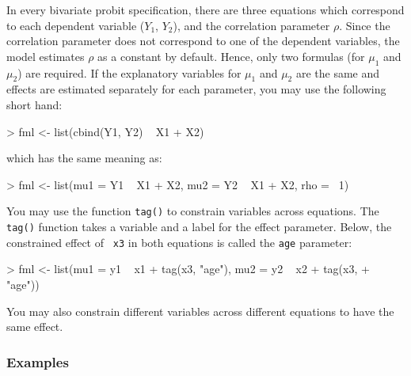 \documentclass{article}
\begin{document}
In every bivariate probit specification, there are three equations
which correspond to each dependent variable ($Y_1$, $Y_2$), and the
correlation parameter $\rho$.  Since the correlation parameter does
not correspond to one of the dependent variables, the model estimates
$\rho$ as a constant by default.  Hence, only two formulas (for
$\mu_1$ and $\mu_2$) are required.  If the explanatory variables for
$\mu_1$ and $\mu_2$ are the same and effects are estimated separately
for each parameter, you may use the following short hand:  
\begin{Schunk}
\begin{Sinput}
> fml <- list(cbind(Y1, Y2) ~ X1 + X2)
\end{Sinput}
\end{Schunk}
which has the same meaning as:  
\begin{Schunk}
\begin{Sinput}
> fml <- list(mu1 = Y1 ~ X1 + X2, mu2 = Y2 ~ X1 + X2, rho = ~1)
\end{Sinput}
\end{Schunk}
You may use the function {\tt tag()} to constrain variables across
equations.  The {\tt tag()} function takes a variable and a label for
the effect parameter.  Below, the constrained effect of {\tt
x3} in both equations is called the {\tt age} parameter:  
\begin{Schunk}
\begin{Sinput}
> fml <- list(mu1 = y1 ~ x1 + tag(x3, "age"), mu2 = y2 ~ x2 + tag(x3, 
+     "age"))
\end{Sinput}
\end{Schunk}
You may also constrain different variables across different equations
to have the same effect.  

\subsubsection{Examples}
\end{document}
